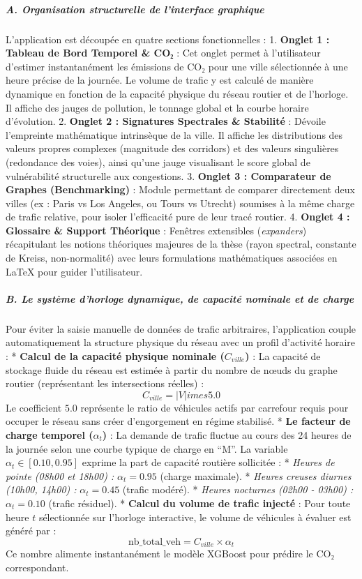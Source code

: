 \documentclass[10pt, a4paper]{article}
\begin{document}
\subparagraph{A. Organisation structurelle de l'interface
graphique}\label{a.-organisation-structurelle-de-linterface-graphique}

L'application est découpée en quatre sections fonctionnelles : 1.
\textbf{Onglet 1 : Tableau de Bord Temporel \& CO₂} : Cet onglet permet
à l'utilisateur d'estimer instantanément les émissions de CO₂ pour une
ville sélectionnée à une heure précise de la journée. Le volume de
trafic y est calculé de manière dynamique en fonction de la capacité
physique du réseau routier et de l'horloge. Il affiche des jauges de
pollution, le tonnage global et la courbe horaire d'évolution. 2.
\textbf{Onglet 2 : Signatures Spectrales \& Stabilité} : Dévoile
l'empreinte mathématique intrinsèque de la ville. Il affiche les
distributions des valeurs propres complexes (magnitude des corridors) et
des valeurs singulières (redondance des voies), ainsi qu'une jauge
visualisant le score global de vulnérabilité structurelle aux
congestions. 3. \textbf{Onglet 3 : Comparateur de Graphes
(Benchmarking)} : Module permettant de comparer directement deux villes
(ex : Paris vs Los Angeles, ou Tours vs Utrecht) soumises à la même
charge de trafic relative, pour isoler l'efficacité pure de leur tracé
routier. 4. \textbf{Onglet 4 : Glossaire \& Support Théorique} :
Fenêtres extensibles (\emph{expanders}) récapitulant les notions
théoriques majeures de la thèse (rayon spectral, constante de Kreiss,
non-normalité) avec leurs formulations mathématiques associées en LaTeX
pour guider l'utilisateur.

\subparagraph{B. Le système d'horloge dynamique, de capacité nominale et
de
charge}\label{b.-le-systuxe8me-dhorloge-dynamique-de-capacituxe9-nominale-et-de-charge}

Pour éviter la saisie manuelle de données de trafic arbitraires,
l'application couple automatiquement la structure physique du réseau
avec un profil d'activité horaire : * \textbf{Calcul de la capacité
physique nominale (\(C_{ville}\))} : La capacité de stockage fluide du
réseau est estimée à partir du nombre de nœuds du graphe routier
(représentant les intersections réelles) :
\[C_{ville} = |V|   imes 5.0\] Le coefficient \(5.0\) représente le
ratio de véhicules actifs par carrefour requis pour occuper le réseau
sans créer d'engorgement en régime stabilisé. * \textbf{Le facteur de
charge temporel (\(\alpha_t\))} : La demande de trafic fluctue au cours
des 24 heures de la journée selon une courbe typique de charge en ``M''.
La variable \(\alpha_t \in [0.10, 0.95]\) exprime la part de capacité
routière sollicitée : * \emph{Heures de pointe (08h00 et 18h00) :}
\(\alpha_t = 0.95\) (charge maximale). * \emph{Heures creuses diurnes
(10h00, 14h00) :} \(\alpha_t = 0.45\) (trafic modéré). * \emph{Heures
nocturnes (02h00 - 03h00) :} \(\alpha_t = 0.10\) (trafic résiduel). *
\textbf{Calcul du volume de trafic injecté} : Pour toute heure \(t\)
sélectionnée sur l'horloge interactive, le volume de véhicules à évaluer
est généré par : \[\text{nb\_total\_veh} = C_{ville} \times \alpha_t\]
Ce nombre alimente instantanément le modèle XGBoost pour prédire le CO₂
correspondant.
\end{document}
